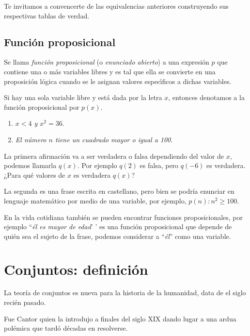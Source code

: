 Te invitamos a convencerte de las equivalencias anteriores construyendo sus
respectivas tablas de verdad.

\subsection{Funci\'on proposicional}

Se llama {\em funci\'on proposicional} (o {\em enunciado abierto}) a 
una {expresi\'on $p$} 
que contiene una o m\'as variables libres y es tal que {ella}
se convierte en una {proposici\'on l\'ogica} cuando
se le asignan valores espec\'\i ficos a dichas variables.

Si hay una sola variable libre y está dada por la letra $x$, 
entonces denotamos a la funci\'on proposicional por $p(x)$.

\begin{ejemplo}\leavevmode
	\begin{enumerate}
		\item {\em $x<4$ y $x^2=36$}.
		\item {\em El número $n$ tiene un cuadrado mayor o igual a 100}.
	\end{enumerate}
	
	La primera afirmaci\'on va a ser verdadera o falsa 
	dependiendo del valor de $x$, podemos llamarla $q(x)$.
	Por ejemplo $q(2)$ es falsa, pero $q(-6)$ es verdadera.
	¿Para qué valores de $x$ es verdadera $q(x)$?
	
	La segunda es una frase escrita en castellano, 
	pero bien se podría enunciar en lenguaje matemático 
	por medio de una variable, por ejemplo, {\em $p(n): n^2\ge 100$}.
\end{ejemplo}

En la vida cotidiana también se pueden encontrar funciones proposicionales, por ejemplo ``{\em él es mayor de edad}' ' es una función proposicional que depende de quién sea el sujeto de la frase, podemos considerar a ``{\em él}'' como una variable.

\section{Conjuntos: definici\'on}

La teoría de conjuntos es nueva para la historia de la humanidad, 
data de el siglo recién pasado. 

Fue Cantor quien la introdujo a finales del siglo 
XIX dando lugar a una ardua polémica que tardó décadas en resolverse.

